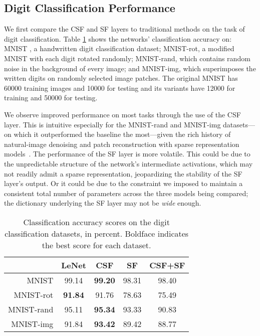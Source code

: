 \documentclass[10pt,twocolumn,letterpaper]{article}
\begin{document}

\subsection{Digit Classification Performance}
We first compare the CSF and SF layers to traditional methods on the task of digit classification. Table \ref{tab:results} shows the networks' classification accuracy on: MNIST \cite{LeBoBeIEEE1998}, a handwritten digit classification dataset; MNIST-rot, a modified MNIST with each digit rotated randomly; MNIST-rand, which contains random noise in the background of every image; and MNIST-img, which superimposes the written digits on randomly selected image patches. The original MNIST has 60000 training images and 10000 for testing and its variants have 12000 for training and 50000 for testing.

We observe improved performance on most tasks through the use of the CSF layer. This is intuitive especially for the MNIST-rand and MNIST-img datasets---on which it outperformed the baseline the most---given the rich history of natural-image denoising and patch reconstruction with sparse representation models~\cite{ElBOOK2010}. The performance of the SF layer is more volatile. This could be due to the unpredictable structure of the network's intermediate activations, which may not readily admit a sparse representation, jeopardizing the stability of the SF layer's output.  Or it could be due to the constraint we imposed to maintain a consistent total number of parameters across the three models being compared; the dictionary underlying the SF layer may not be \textit{wide} enough.

\begin{table}[]
\centering
\caption{Classification accuracy scores on the digit classification datasets, in percent. Boldface indicates the best score for each dataset.}
\label{tab:results}
\begin{tabular}{|r|c|c|c|c|}
	\hline
	           & LeNet      & CSF        & SF    & CSF+SF \\\hline\hline
	MNIST      & 99.14      & \bf{99.20} & 98.31 & 98.40  \\ \hline
	MNIST-rot  & \bf{91.84} & 91.76      & 78.63 & 75.49  \\ \hline
	MNIST-rand & 95.11      & \bf{95.34} & 93.33 & 90.83  \\ \hline
	MNIST-img  & 91.84      & \bf{93.42} & 89.42 & 88.77  \\ \hline
\end{tabular}
\end{table}
\end{document}
